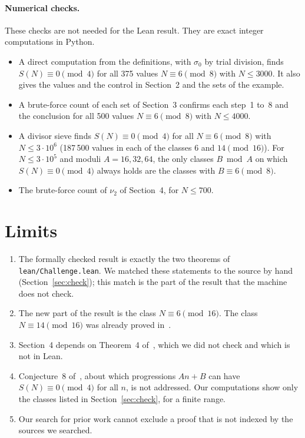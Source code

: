 \documentclass[11pt]{article}
\theoremstyle{remark}
\begin{document}
\paragraph{Numerical checks.} These checks are not needed for the Lean result. They are exact integer computations in Python.
\begin{itemize}
\item A direct computation from the definitions, with $\sigma_0$ by trial division, finds $S(N)\equiv 0\pmod 4$ for all 375 values $N\equiv 6\pmod 8$ with $N\le 3000$. It also gives the values and the control in Section~2 and the sets of the example.
\item A brute-force count of each set of Section~3 confirms each step~1 to~8 and the conclusion for all 500 values $N\equiv 6\pmod 8$ with $N\le 4000$.
\item A divisor sieve finds $S(N)\equiv 0\pmod 4$ for all $N\equiv 6\pmod 8$ with $N\le 3\cdot 10^6$ (187\,500 values in each of the classes $6$ and $14 \pmod{16}$). For $N\le 3\cdot 10^5$ and moduli $A=16,32,64$, the only classes $B\bmod A$ on which $S(N)\equiv 0\pmod 4$ always holds are the classes with $B\equiv 6\pmod 8$.
\item The brute-force count of $\nu_2$ of Section~4, for $N\le 700$.
\end{itemize}

\section{Limits}

\begin{enumerate}
\item The formally checked result is exactly the two theorems of \texttt{lean/Challenge.lean}. We matched these statements to the source by hand (Section~\ref{sec:check}); this match is the part of the result that the machine does not check.
\item The new part of the result is the class $N\equiv 6\pmod{16}$. The class $N\equiv 14\pmod{16}$ was already proved in~\cite[Theorem~1]{JKKMS}.
\item Section~4 depends on Theorem~4 of~\cite{JKKMS}, which we did not check and which is not in Lean.
\item Conjecture~8 of~\cite{JKKMS}, about which progressions $An+B$ can have $S(N)\equiv 0\pmod 4$ for all $n$, is not addressed. Our computations show only the classes listed in Section~\ref{sec:check}, for a finite range.
\item Our search for prior work cannot exclude a proof that is not indexed by the sources we searched.
\end{enumerate}
\end{document}
